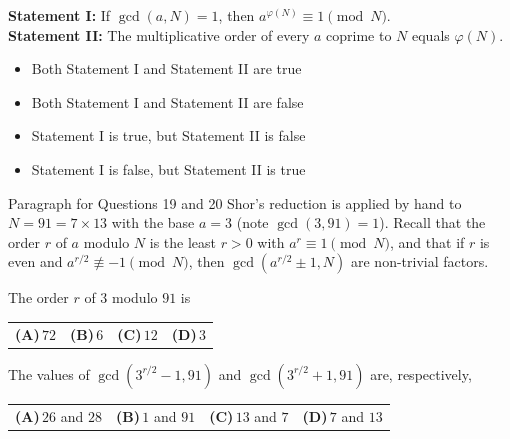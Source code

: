 \documentclass[11pt,a4paper]{article}
\newcommand{\optlabel}[1]{\textbf{(#1)}}
\newenvironment{qitem}[1]{\begin{list}{}{\setlength{\leftmargin}{3.3em}\setlength{\labelwidth}{3.1em}%
  \setlength{\labelsep}{0.2em}\setlength{\topsep}{3pt}\setlength{\parsep}{3pt}}\item[\textbf{Q.#1}\hfill]}{\end{list}}
\newcommand{\qsep}{\par\vspace{2pt}{\color{black!15}\hrule}\vspace{4pt}}
\begin{document}
\begin{qitem}{18}
\textbf{Statement I:} If $\gcd(a, N) = 1$, then $a^{\varphi(N)} \equiv 1 \pmod N$.\\[1mm]
\textbf{Statement II:} The multiplicative order of every $a$ coprime to $N$ equals $\varphi(N)$.
\begin{itemize}[leftmargin=2.6em, labelsep=0.4em, itemsep=2pt, topsep=3pt]
\item[\optlabel{A}] Both Statement I and Statement II are true
\item[\optlabel{B}] Both Statement I and Statement II are false
\item[\optlabel{C}] Statement I is true, but Statement II is false
\item[\optlabel{D}] Statement I is false, but Statement II is true
\end{itemize}
\end{qitem}
\qsep

\begin{passagebox}{Paragraph for Questions 19 and 20}
Shor's reduction is applied by hand to $N = 91 = 7\times13$ with the base $a = 3$ (note $\gcd(3, 91) = 1$). Recall that the
order $r$ of $a$ modulo $N$ is the least $r > 0$ with $a^r \equiv 1 \pmod N$, and that if $r$ is even and $a^{r/2} \not\equiv -1 \pmod N$,
then $\gcd(a^{r/2} \pm 1, N)$ are non-trivial factors.
\end{passagebox}
\begin{qitem}{19}
The order $r$ of $3$ modulo $91$ is
\par\smallskip\noindent\begin{tabularx}{\linewidth}{@{}*{4}{L}@{}}
\optlabel{A}\,$72$ & \optlabel{B}\,$6$ & \optlabel{C}\,$12$ & \optlabel{D}\,$3$
\end{tabularx}
\end{qitem}
\qsep

\begin{qitem}{20}
The values of $\gcd(3^{r/2} - 1, 91)$ and $\gcd(3^{r/2} + 1, 91)$ are, respectively,
\par\smallskip\noindent\begin{tabularx}{\linewidth}{@{}*{4}{L}@{}}
\optlabel{A}\,$26$ and $28$ & \optlabel{B}\,$1$ and $91$ & \optlabel{C}\,$13$ and $7$ & \optlabel{D}\,$7$ and $13$
\end{tabularx}
\end{qitem}
\qsep

\newpage
\end{document}
